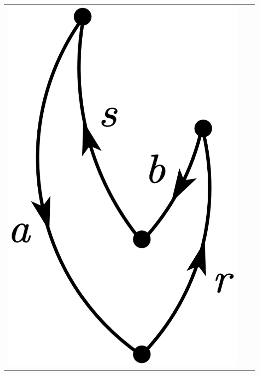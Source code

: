 \documentclass[a4paper]{book}
\newcounter{solution}[chapter]
\begin{document}
\begin{solution}
\begin{itemize}
\begin{center}
\begin{tabular}{ccc}
		\begin{minipage}{0.22\linewidth}
		\centering
		\includegraphics[scale=1.0,trim=0 -4 0 -4]{./pictures/6.07/diagram_5.png}
		\end{minipage} &
		

\end{tabular}
\end{center}
\end{itemize}
\end{solution}
\end{document}
